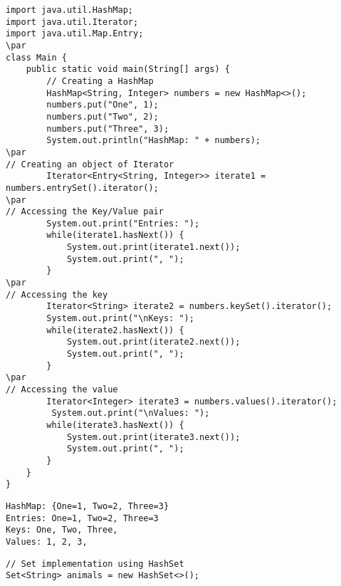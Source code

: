 \documentclass{book}
\def\lthtmlcheckvsize{\ifdim\ht\sizebox<\vsize 
  \ifdim\wd\sizebox<\hsize\expandafter\hfill\fi \expandafter\vfill
  \else\expandafter\vss\fi}%
\begin{document}
{\newpage\clearpage
{}%
\begin{lstlisting}
import java.util.HashMap;
import java.util.Iterator;
import java.util.Map.Entry;
\par
class Main {
    public static void main(String[] args) {
        // Creating a HashMap
        HashMap<String, Integer> numbers = new HashMap<>();
        numbers.put("One", 1);
        numbers.put("Two", 2);
        numbers.put("Three", 3);
        System.out.println("HashMap: " + numbers);
\par
// Creating an object of Iterator
        Iterator<Entry<String, Integer>> iterate1 = numbers.entrySet().iterator();
\par
// Accessing the Key/Value pair
        System.out.print("Entries: ");
        while(iterate1.hasNext()) {
            System.out.print(iterate1.next());
            System.out.print(", ");
        }
\par
// Accessing the key
        Iterator<String> iterate2 = numbers.keySet().iterator();
        System.out.print("\nKeys: ");
        while(iterate2.hasNext()) {
            System.out.print(iterate2.next());
            System.out.print(", ");
        }
\par
// Accessing the value
        Iterator<Integer> iterate3 = numbers.values().iterator();
         System.out.print("\nValues: ");
        while(iterate3.hasNext()) {
            System.out.print(iterate3.next());
            System.out.print(", ");
        }
    }
}
\end{lstlisting}%
\lthtmlfigureZ
\lthtmlcheckvsize\clearpage}

{\newpage\clearpage
{}%
\begin{lstlisting}
HashMap: {One=1, Two=2, Three=3}
Entries: One=1, Two=2, Three=3
Keys: One, Two, Three,
Values: 1, 2, 3,
\end{lstlisting}%
\lthtmlfigureZ
\lthtmlcheckvsize\clearpage}

{\newpage\clearpage
{}%
\begin{lstlisting}
// Set implementation using HashSet
Set<String> animals = new HashSet<>();
\end{lstlisting}%
\lthtmlfigureZ
\lthtmlcheckvsize\clearpage}
\end{document}
